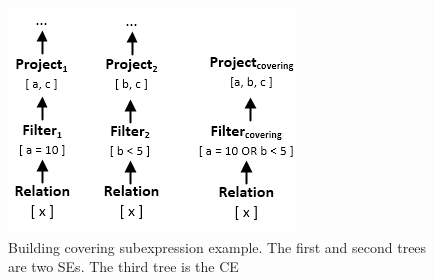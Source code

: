 \begin{figure}[!htb]
	\centering
	\includegraphics[scale=0.75]{figures/covering}
	\caption{Building covering subexpression example. The first and second trees are two SEs. The third tree is the CE}
	\label{fig:covering}
\end{figure}

